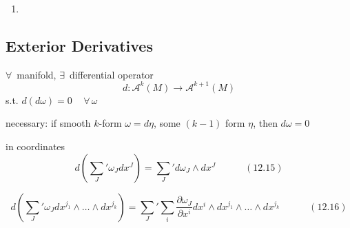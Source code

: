 \documentclass[11pt]{amsart}
\theoremstyle{definition}
\begin{document}
\begin{enumerate}
\[
\begin{gathered}
  (F^*\omega) \wedge (F^* \eta) e_{\underline{K}} = \omega_{\underline{J}} DF^{\underline{J}}_{\underline{I}} \eta_{\underline{L}} DF^{\underline{L}}_{ \underline{M}} (e^{\underline{I}} \wedge e^{\underline{M}} ) e_{\underline{K}} = \omega_{\underline{J}} \eta_{\underline{L}} DF^{\underline{J}}_{\underline{I}} DF^{\underline{L}}_{\underline{M}} \delta^{\underline{I}\underline{M}}_{\underline{K}}     = \omega_{\underline{I}} \eta_{\underline{J}} DF^{\underline{I}}_{\underline{L}} DF^{\underline{J}}_{\underline{M}} \delta^{\underline{L} \underline{M}}_{\underline{K}}
\end{gathered}
\]
\item[(c)]
\end{enumerate}


\subsection*{ Exterior Derivatives }

$\forall \, $ manifold, $\exists \, $ differential operator
\[
d: \mathcal{A}^k(M) \to \mathcal{A}^{k+1}(M)
\]
s.t. $d(d\omega ) =0 \quad \, \forall \, \omega$

necessary: if smooth $k$-form $\omega = d\eta$, some $(k-1)$ form $\eta$, then $d\omega =0$

in coordinates
\begin{equation}
  d \left( \sum_J' \omega_J dx^J \right) = \sum_J' d\omega_J \wedge dx^J \quad \quad \quad (12.15)
\end{equation}

\begin{equation}
  d\left( \sum_J' \omega_J dx^{j_1} \wedge \dots \wedge dx^{j_k} \right) = \sum_J' \sum_i \frac{ \partial \omega_J}{ \partial x^i} dx^i \wedge dx^{j_1} \wedge \dots \wedge dx^{j_k} \quad \quad \quad (12.16)
\end{equation}
\end{document}
